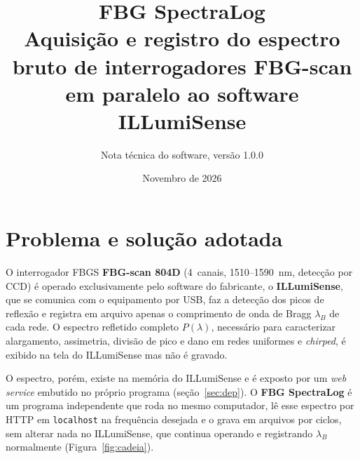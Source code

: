 \documentclass[11pt,a4paper]{article}
\title{\textbf{FBG SpectraLog}\\[2pt]
\large Aquisição e registro do espectro bruto de interrogadores FBG-scan\\
em paralelo ao software ILLumiSense}
\author{Nota técnica do software, versão 1.0.0}
\date{Novembro de 2026}
\begin{document}
\maketitle

\section{Problema e solução adotada}

O interrogador FBGS \textbf{FBG-scan 804D} (4~canais, 1510--1590~nm, detecção por CCD) é operado
exclusivamente pelo software do fabricante, o \textbf{ILLumiSense}, que se comunica com o equipamento
por USB, faz a detecção dos picos de reflexão e registra em arquivo apenas o comprimento de onda de
Bragg $\lambda_B$ de cada rede. O espectro refletido completo $P(\lambda)$, necessário para
caracterizar alargamento, assimetria, divisão de pico e dano em redes uniformes e \emph{chirped}, é
exibido na tela do ILLumiSense mas não é gravado.

O espectro, porém, existe na memória do ILLumiSense e é exposto por um \emph{web service} embutido
no próprio programa (seção~\ref{sec:dep}). O \textbf{FBG SpectraLog} é um programa independente que
roda no mesmo computador, lê esse espectro por HTTP em \texttt{localhost} na frequência desejada e o
grava em arquivos por ciclos, sem alterar nada no ILLumiSense, que continua operando e registrando
$\lambda_B$ normalmente (Figura~\ref{fig:cadeia}).
\end{document}
